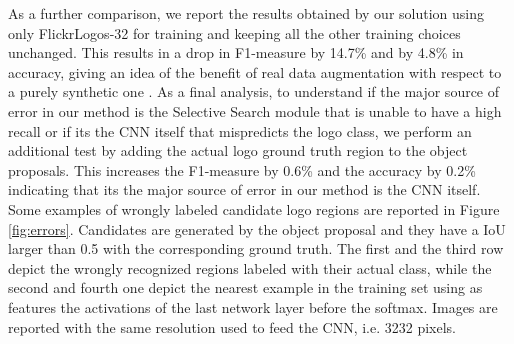\documentclass[final,5p,twocolumn]{elsarticle}
\begin{document}
As a further comparison, we report the results obtained by our solution using only FlickrLogos-32 for training and keeping all the other training choices unchanged. This results in a drop in F1-measure by 14.7\% and by 4.8\% in accuracy, giving an idea of the benefit of real data augmentation with respect to a purely synthetic one \cite{eggert2015benefit}.
As a final analysis, to understand if the major source of error in our method is the Selective Search module that is unable to have a high recall or if its the CNN itself that mispredicts the logo class, we perform an additional test by adding the actual logo ground truth region to the object proposals. This increases the F1-measure by 0.6\% and the accuracy by 0.2\% indicating that its the major source of error in our method is the CNN itself. Some examples of wrongly labeled candidate logo regions are reported in Figure \ref{fig:errors}. Candidates are generated by the object proposal and they have a IoU larger than 0.5 with the corresponding ground truth.  The first and the third row depict the wrongly recognized regions labeled with their actual class, while the second and fourth one depict the nearest example in the training set using as features the activations of the last network layer before the softmax. Images are reported with the same resolution used to feed the CNN, i.e. 3232 pixels.
\end{document}
